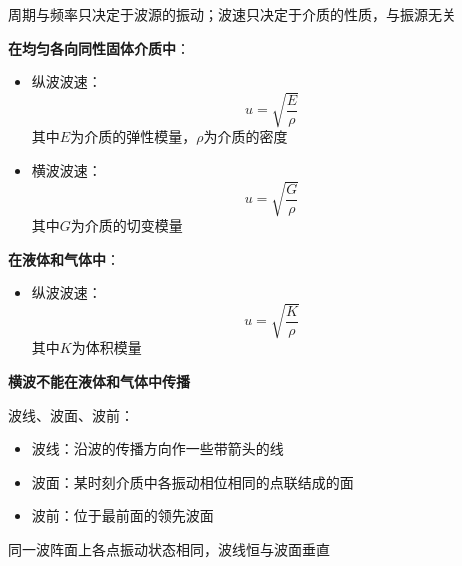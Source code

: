 \documentclass[12pt, a4paper, twoside]{ctexbook}
\begin{document}
周期与频率只决定于波源的振动；波速只决定于介质的性质，与振源无关

\textbf{在均匀各向同性固体介质中}：
\begin{itemize}
    \item {\sonti 纵波波速}：
    $$
    u=\sqrt{\frac{E}{\rho}}
    $$
    其中$E$为介质的弹性模量，$\rho$为介质的密度
    \item {\sonti 横波波速}：
    $$
    u=\sqrt{\frac{G}{\rho}}
    $$
    其中$G$为介质的切变模量
\end{itemize}

\textbf{在液体和气体中}：
\begin{itemize}
    \item {\sonti 纵波波速}：
    $$
    u=\sqrt{\frac{K}{\rho}}
    $$
    其中$K$为体积模量
\end{itemize}

\textbf{横波不能在液体和气体中传播}

{\sonti 波线、波面、波前}：
\begin{itemize}
    \item {\sonti 波线}：沿波的传播方向作一些带箭头的线
    \item {\sonti 波面}：某时刻介质中各振动相位相同的点联结成的面
    \item {\sonti 波前}：位于最前面的领先波面
\end{itemize}

同一波阵面上各点振动状态相同，波线恒与波面垂直
\end{document}
